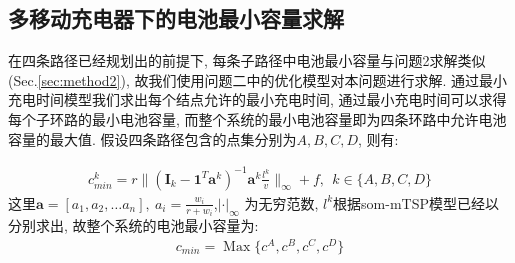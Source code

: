 \subsection{多移动充电器下的电池最小容量求解}

在四条路径已经规划出的前提下, 每条子路径中电池最小容量与问题2求解类似(Sec.\ref{sec:method2}), 故我们使用问题二中的优化模型对本问题进行求解. 通过最小充电时间模型我们求出每个结点允许的最小充电时间, 通过最小充电时间可以求得每个子环路的最小电池容量, 而整个系统的最小电池容量即为四条环路中允许电池容量的最大值.
假设四条路径包含的点集分别为$A,B,C,D$, 则有:


\begin{eqnarray}
    c^k_{min} =r \| (\textbf{I}_k- \textbf{1}^T\textbf{a}^k )^{-1}\textbf{a}^k \frac{l^k}{v}\|_{\infty} +f ,~~k \in \{A,B,C,D\}
\end{eqnarray}
这里$\textbf{a} = [a_1, a_2, \dots a_n],~ a_i = \frac{w_i}{r+w_i}$,$|\cdot|_\infty$ 为无穷范数, $l^k$根据som-mTSP模型已经以分别求出, 故整个系统的电池最小容量为:
\begin{eqnarray}
    c_{min} = \mathop{Max}\{c^A,c^B, c^C,c^D\}
\end{eqnarray}
